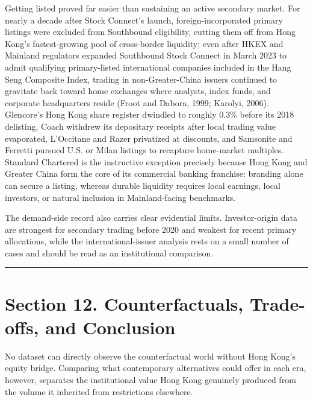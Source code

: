 \documentclass[11pt,letterpaper]{article}
\begin{document}
Getting listed proved far easier than sustaining an active secondary market. For nearly a decade after Stock Connect's launch, foreign-incorporated primary listings were excluded from Southbound eligibility, cutting them off from Hong Kong's fastest-growing pool of cross-border liquidity; even after HKEX and Mainland regulators expanded Southbound Stock Connect in March 2023 to admit qualifying primary-listed international companies included in the Hang Seng Composite Index, trading in non-Greater-China issuers continued to gravitate back toward home exchanges where analysts, index funds, and corporate headquarters reside (Froot and Dabora, 1999; Karolyi, 2006). Glencore's Hong Kong share register dwindled to roughly 0.3\% before its 2018 delisting, Coach withdrew its depositary receipts after local trading value evaporated, L'Occitane and Razer privatized at discounts, and Samsonite and Ferretti pursued U.S. or Milan listings to recapture home-market multiples. Standard Chartered is the instructive exception precisely because Hong Kong and Greater China form the core of its commercial banking franchise: branding alone can secure a listing, whereas durable liquidity requires local earnings, local investors, or natural inclusion in Mainland-facing benchmarks.

The demand-side record also carries clear evidential limits. Investor-origin data are strongest for secondary trading before 2020 and weakest for recent primary allocations, while the international-issuer analysis rests on a small number of cases and should be read as an institutional comparison.

\par\medskip\noindent\rule{\linewidth}{0.35pt}\par\medskip
\section*{\texorpdfstring{Section 12. Counterfactuals, Trade-offs, and Conclusion}{Section 12. Counterfactuals, Trade-offs, and Conclusion}}
No dataset can directly observe the counterfactual world without Hong Kong's equity bridge. Comparing what contemporary alternatives could offer in each era, however, separates the institutional value Hong Kong genuinely produced from the volume it inherited from restrictions elsewhere.
\end{document}
